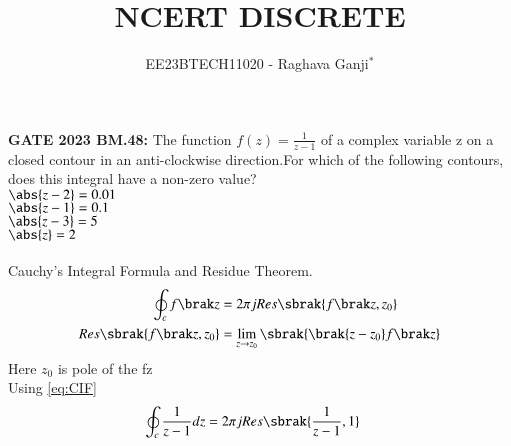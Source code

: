 \documentclass[journal,12pt,twocolumn]{IEEEtran}
\theoremstyle{remark}
\begin{document}

\vspace{3cm}

\title{NCERT DISCRETE}
\author{EE23BTECH11020 - Raghava Ganji$^{*}$%
}
\maketitle
\newpage
\bigskip

\renewcommand{\thefigure}{\theenumi}
\renewcommand{\thetable}{\theenumi}

\textbf{GATE 2023 BM.48:}
The function $f(z)=\frac{1}{z-1}$ of a complex variable z on a closed contour in an anti-clockwise direction.For which of the following contours, does this integral have a non-zero value?\\
$\abs{z-2}=0.01$\\
$\abs{z-1}=0.1$\\
$\abs{z-3}=5$\\
$\abs{z}=2$\\
\solution\\
Cauchy's Integral Formula and Residue Theorem.
\begin{align}
\oint_{c}f\brak z&=2\pi jRes\sbrak{f\brak z,z_0}\label{eq:CIF}\\
Res\sbrak{f\brak z,z_0}&=\lim_{z\to z_0}\sbrak{\brak{z-z_0}f\brak z}\label{eq:Res Thm}
\end{align}
Here $z_0$ is pole of the f\brak z\\
Using \eqref{eq:CIF}
\begin{align}
\oint_{c}\frac{1}{z-1}dz &=2\pi jRes\sbrak{\frac{1}{z-1},1}
\end{align}
\end{document}
